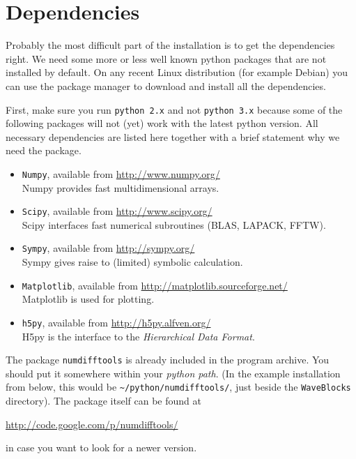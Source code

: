 \documentclass[a4paper,10pt]{report}
\begin{document}
\section{Dependencies}

Probably the most difficult part of the installation is to get the dependencies
right. We need some more or less well known python packages that are not installed
by default. On any recent Linux distribution (for example Debian) you can use the
package manager to download and install all the dependencies.

First, make sure you run \texttt{python 2.x} and not \texttt{python 3.x} because
some of the following packages will not (yet) work with the latest python version.
All necessary dependencies are listed here together with a brief statement why we
need the package.

\begin{itemize}
  \item \texttt{Numpy}, available from \url{http://www.numpy.org/} \\
        Numpy provides fast multidimensional arrays.
  \item \texttt{Scipy}, available from \url{http://www.scipy.org/} \\
        Scipy interfaces fast numerical subroutines (BLAS, LAPACK, FFTW).
  \item \texttt{Sympy}, available from \url{http://sympy.org/} \\
        Sympy gives raise to (limited) symbolic calculation.
  \item \texttt{Matplotlib}, available from \url{http://matplotlib.sourceforge.net/} \\
        Matplotlib is used for plotting.
  \item \texttt{h5py}, available from \url{http://h5py.alfven.org/} \\
        H5py is the interface to the \emph{Hierarchical Data Format}.
\end{itemize}

The package \texttt{numdifftools} is already included in the program archive.
You should put it somewhere within your \emph{python path}. (In the example installation
from below, this would be \verb|~/python/numdifftools/|, just beside the
\texttt{WaveBlocks} directory). The package itself can be found at
\begin{center}
  \url{http://code.google.com/p/numdifftools/}
\end{center}
in case you want to look for a newer version.
\end{document}
